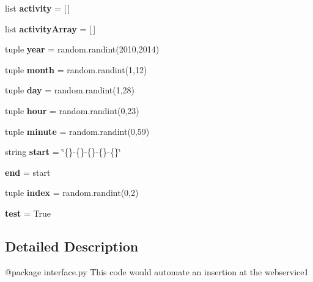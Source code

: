 \begin{DoxyCompactItemize}
\item 
\hypertarget{namespacews1_a87b995ba02111ca86081f5ae3886c8f5}{list {\bfseries activity} = \mbox{[}$\,$\mbox{]}}\label{namespacews1_a87b995ba02111ca86081f5ae3886c8f5}

\item 
\hypertarget{namespacews1_a7c62704e81cfcf554c0420b08751b65c}{list {\bfseries activity\+Array} = \mbox{[}$\,$\mbox{]}}\label{namespacews1_a7c62704e81cfcf554c0420b08751b65c}

\item 
\hypertarget{namespacews1_ae8297f2d5ee6711c964ee07a22fc96ab}{tuple {\bfseries year} = random.\+randint(2010,2014)}\label{namespacews1_ae8297f2d5ee6711c964ee07a22fc96ab}

\item 
\hypertarget{namespacews1_a10cf9ac92c0899387f1f1a62852bde51}{tuple {\bfseries month} = random.\+randint(1,12)}\label{namespacews1_a10cf9ac92c0899387f1f1a62852bde51}

\item 
\hypertarget{namespacews1_a6bbbe43de25827e2e48d9feaa729d87e}{tuple {\bfseries day} = random.\+randint(1,28)}\label{namespacews1_a6bbbe43de25827e2e48d9feaa729d87e}

\item 
\hypertarget{namespacews1_abbf1acd3467cbe7502f36cd561e32be4}{tuple {\bfseries hour} = random.\+randint(0,23)}\label{namespacews1_abbf1acd3467cbe7502f36cd561e32be4}

\item 
\hypertarget{namespacews1_a8e516f18d16f29dc53ddc5f9a1808994}{tuple {\bfseries minute} = random.\+randint(0,59)}\label{namespacews1_a8e516f18d16f29dc53ddc5f9a1808994}

\item 
\hypertarget{namespacews1_abef64881d152a869ac7ab5e9ac0e9d21}{string {\bfseries start} = \char`\"{}\{\}-\/\{\}-\/\{\}-\/\{\}-\/\{\}\char`\"{}}\label{namespacews1_abef64881d152a869ac7ab5e9ac0e9d21}

\item 
\hypertarget{namespacews1_afb358f48b1646c750fb9da6c6585be2b}{{\bfseries end} = start}\label{namespacews1_afb358f48b1646c750fb9da6c6585be2b}

\item 
\hypertarget{namespacews1_a06e0fbefa5d1404ce6119bd455e4703e}{tuple {\bfseries index} = random.\+randint(0,2)}\label{namespacews1_a06e0fbefa5d1404ce6119bd455e4703e}

\item 
\hypertarget{namespacews1_a05a671c66aefea124cc08b76ea6d30bb}{{\bfseries test} = True}\label{namespacews1_a05a671c66aefea124cc08b76ea6d30bb}

\end{DoxyCompactItemize}


\subsection{Detailed Description}
\begin{DoxyVerb}@package interface.py
    This code would automate an insertion at the webservice1
\end{DoxyVerb}
 